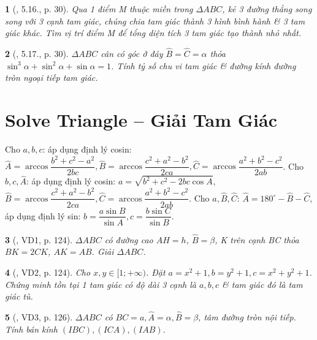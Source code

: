 \documentclass{article}
\newtheorem{baitoan}{}
\begin{document}
\begin{baitoan}[\cite{Hai_Hung_Thu_Tung2022_tap_1}, 5.16., p. 30]
	Qua 1 điểm M thuộc miền trong $\Delta ABC$, kẻ 3 đường thẳng song song với 3 cạnh tam giác, chúng chia tam giác thành 3 hình bình hành \& 3 tam giác khác. Tìm vị trí điểm M để tổng diện tích 3 tam giác tạo thành nhỏ nhất.
\end{baitoan}

\begin{baitoan}[\cite{Hai_Hung_Thu_Tung2022_tap_1}, 5.17., p. 30]
	$\Delta ABC$ cân có góc ở đáy $\widehat{B} = \widehat{C} = \alpha$ thỏa $\sin^3\alpha + \sin^2\alpha + \sin\alpha = 1$. Tính tỷ số chu vi tam giác \& đường kính đường tròn ngoại tiếp tam giác.
\end{baitoan}


\section{Solve Triangle -- Giải Tam Giác}
 Cho $a,b,c$: áp dụng định lý cosin: $\widehat{A} = \arccos\dfrac{b^2 + c^2 - a^2}{2bc},\widehat{B} = \arccos\dfrac{c^2 + a^2 - b^2}{2ca},\widehat{C} = \arccos\dfrac{a^2 + b^2 - c^2}{2ab}$.  Cho $b,c,\widehat{A}$: áp dụng định lý cosin: $a = \sqrt{b^2 + c^2 - 2bc\cos A}$, $\widehat{B} = \arccos\dfrac{c^2 + a^2 - b^2}{2ca},\widehat{C} = \arccos\dfrac{a^2 + b^2 - c^2}{2ab}$.  Cho $a,\widehat{B},\widehat{C}$: $\widehat{A} = 180^\circ - \widehat{B} - \widehat{C}$, áp dụng định lý sin: $b = \dfrac{a\sin B}{\sin A},c = \dfrac{b\sin C}{\sin B}$.

\begin{baitoan}[\cite{TLCT_hinh_hoc_10}, VD1, p. 124]
	$\Delta ABC$ có đường cao $AH = h$, $\widehat{B} = \beta$, K trên cạnh BC thỏa $BK = 2CK$, $AK = AB$. Giải $\Delta ABC$.
\end{baitoan}

\begin{baitoan}[\cite{TLCT_hinh_hoc_10}, VD2, p. 124]
	Cho $x,y\in[1;+\infty)$. Đặt $a = x^2 + 1,b = y^2 + 1,c = x^2 + y^2 + 1$. Chứng minh tồn tại 1 tam giác có độ dài 3 cạnh là $a,b,c$ \& tam giác đó là tam giác tù.
\end{baitoan}

\begin{baitoan}[\cite{TLCT_hinh_hoc_10}, VD3, p. 126]
	$\Delta ABC$ có $BC = a,\widehat{A} = \alpha,\widehat{B} = \beta$, tâm đường tròn nội tiếp. Tính bán kính $(IBC),(ICA),(IAB)$.
\end{baitoan}
\end{document}
